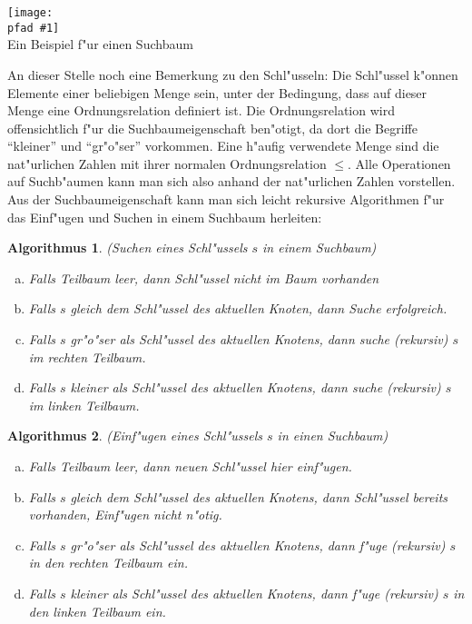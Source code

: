 \documentclass[a4paper,titlepage]{article}
\newtheorem{alg}{Algorithmus}
\newcommand{\pfad}{../pics/}
\newcommand{\centerpic}[3]{
	\begin{center}
		\texttt{[image: \\pfad \#1]} \\
		{\small #3}
	\end{center}
}
\begin{document}
\begin{appendix}
\centerpic{bsp_suchbaum}{4.5}{Ein Beispiel f"ur einen Suchbaum} 
An dieser Stelle noch eine Bemerkung zu den Schl"usseln: Die
Schl"ussel k"onnen Elemente einer beliebigen Menge sein, unter der
Bedingung, dass auf dieser Menge eine Ordnungsrelation definiert
ist. Die Ordnungsrelation wird offensichtlich f"ur die
Suchbaumeigenschaft ben"otigt, da dort die Begriffe "`kleiner"'
und "`gr"o"ser"' vorkommen. Eine h"aufig verwendete Menge sind die
nat"urlichen Zahlen mit ihrer normalen Ordnungsrelation $\leq$.
Alle Operationen auf Suchb"aumen kann man sich also anhand
der nat"urlichen Zahlen vorstellen.\\
Aus der Suchbaumeigenschaft kann man sich leicht rekursive
Algorithmen f"ur das Einf"ugen und Suchen in einem Suchbaum
herleiten: \\


\begin{alg} \label{search}
    (Suchen eines Schl"ussels $s$ in einem Suchbaum)
    \begin {enumerate}[(a)]
    \item Falls Teilbaum leer, dann Schl"ussel nicht im Baum
    vorhanden
    \item Falls $s$ gleich dem Schl"ussel des aktuellen Knoten,
    dann Suche erfolgreich.
    \item Falls $s$ gr"o"ser als Schl"ussel des aktuellen Knotens,
    dann suche (rekursiv) $s$ im rechten Teilbaum.
    \item Falls $s$ kleiner als Schl"ussel des aktuellen Knotens,
    dann suche (rekursiv) $s$ im linken Teilbaum.
    \end {enumerate}
\end{alg}


\begin{alg} \label{insert}
    (Einf"ugen eines Schl"ussels $s$ in einen Suchbaum)
    \begin {enumerate}[(a)]
    \item Falls Teilbaum leer, dann neuen Schl"ussel hier
    einf"ugen.
    \item Falls $s$ gleich dem Schl"ussel des aktuellen Knotens,
    dann Schl"ussel bereits vorhanden, Einf"ugen nicht n"otig.
    \item Falls $s$ gr"o"ser als Schl"ussel des aktuellen Knotens,
    dann f"uge (rekursiv) $s$ in den rechten Teilbaum ein.
    \item Falls $s$ kleiner als Schl"ussel des aktuellen Knotens,
    dann f"uge (rekursiv) $s$ in den linken Teilbaum ein.
    \end {enumerate}
\end{alg}



\end{appendix}
\end{document}
